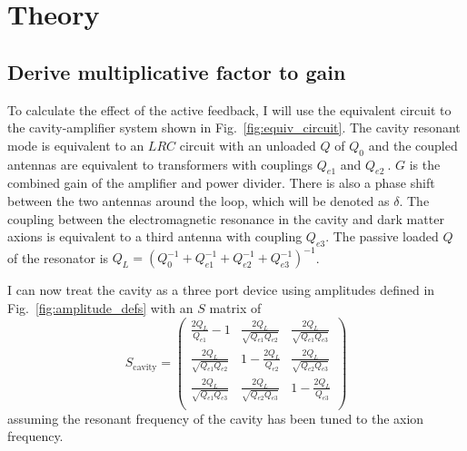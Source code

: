 \documentclass[aps,prl,twocolumn,groupedaddress]{revtex4-1}
\begin{document}
\section{Theory}

\subsection{Derive multiplicative factor to gain}
To calculate the effect of the active feedback, I will use the equivalent circuit to the cavity-amplifier system shown in Fig.~\ref{fig:equiv_circuit}.  The cavity resonant mode is equivalent to an $LRC$ circuit with an unloaded $Q$ of $Q_0$ and the coupled antennas are equivalent to transformers with couplings $Q_{e1}$ and $Q_{e2}~$\cite{Montgomery:1948}.  $G$ is the combined gain of the amplifier and power divider.  There is also a phase shift between the two antennas around the loop, which will be denoted as $\delta$.  The coupling between the electromagnetic resonance in the cavity and dark matter axions is equivalent to a third antenna with coupling $Q_{e3}$.  The passive loaded $Q$ of the resonator is $Q_L=\left(Q_0^{-1}+Q_{e1}^{-1}+Q_{e2}^{-1}+Q_{e3}^{-1}\right)^{-1}$.

I can now treat the cavity as a three port device using amplitudes defined in Fig.~\ref{fig:amplitude_defs} with an $S$ matrix of
\begin{equation}
S_{\mathrm{cavity}}=
\left( \begin{array}{ccc}
		\frac{2Q_L}{Q_{e1}}-1 & \frac{2Q_L}{\sqrt{Q_{e1}Q_{e2}}} & \frac{2Q_L}{\sqrt{Q_{e1}Q_{e3}}}  \\
		\frac{2Q_L}{\sqrt{Q_{e1}Q_{e2}}} & 1-\frac{2Q_L}{Q_{e2}} & \frac{2Q_L}{\sqrt{Q_{e2}Q_{e3}}}  \\
		\frac{2Q_L}{\sqrt{Q_{e1}Q_{e3}}} &  \frac{2Q_L}{\sqrt{Q_{e2}Q_{e3}}} &  1-\frac{2Q_L}{Q_{e3}} \\
		\end{array}\right)
\end{equation}
    assuming the resonant frequency of the cavity has been tuned to the axion frequency.
\end{document}
